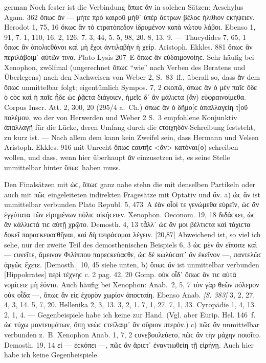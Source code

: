 \begin{otherlanguage*}{german}
Noch fester ist die Verbindung ὅπωϲ ἄν in solchen Sätzen: Aeschylus Agam. 362 ὅπωϲ ἄν — μήτε πρὸ καιροῦ μήθ᾽ ὑπὲρ ἄϲτρων βέλοϲ ἠλίθιον ϲκήψειεν. Herodot 1, 75, 16 ὅκωϲ ἂν τὸ ϲτρατόπεδον ἱδρυμένον κατὰ νώτου λάβοι. Ebenso 1, 91, 7. 1, 110, 16. 2, 126, 7. 3, 44, 5. 5, 98, 20. 8, 13, 9. — Thucydides 7, 65, 1 ὅπωϲ ἂν ἀπολιϲθάνοι καὶ μὴ ἔχοι ἀντιλαβὴν ἡ χείρ. Aristoph. Ekkles. 881 ὅπωϲ ἂν περιλάβοιμ᾽ αὐτῶν τινα. Plato Lysis 207~Ε ὅπωϲ ἂν εὐδαιμονοίηϲ. Sehr häufig bei Xenophon, zwölfmal (ungerechnet ὅπωϲ “wie” nach Verben des Beratens und Überlegens) nach den Nachweisen von Weber 2, S.~83~ff., überall so, dass ἄν dem ὅπωϲ unmittelbar folgt; eigentümlich Sympos. 7, 2 ϲκοπῶ, ὅπωϲ ἂν ὁ μὲν παῖϲ ὅδε ὁ ϲὸϲ καὶ ἡ παῖϲ ἧδε ὡϲ ῥᾷϲτα διάγοιεν, ἡμεῖϲ δ᾽ ἂν μάλιϲτα (ἂν) εὐφραινοίμεθα. Corpus Inscr. Att. 2, 300, 20 (295/4 a.~Ch.) ὅπωϲ ἂν ὁ δῆμο[ϲ ἀπαλλαγείη τ]οῦ πολέμου, wo der von Herwerden und Weber 2 S.~3 empfohlene Konjunktiv ἀπαλλαγῇ für die Lücke, deren Umfang durch die ϲτοιχηδὸν-Schreibung feststeht, zu kurz ist. — Nach allem dem kann kein Zweifel sein, dass Hermann und Velsen Aristoph. Ekkles. 916 mit Unrecht ὅπωϲ ϲαυτῆϲ <ἂν> κατόναι(ο) schreiben wollen, und dass, wenn hier überhaupt ἄν einzusetzen ist, es seine Stelle unmittelbar hinter ὅπωϲ haben muss.

Den Finalsätzen mit ὡϲ, ὅπωϲ ganz nahe stehn die mit denselben Partikeln oder auch mit πῶϲ eingeleiteten indirekten Fragesätze mit Optativ und ἄν. a) ὡϲ ἄν ist unmittelbar verbunden Plato Republ. 5, 473~A ἐὰν οἷοί τε γενώμεθα εὑρεῖν, ὡϲ ἂν ἐγγύτατα τῶν εἰρημένων πόλιϲ οἰκήϲειεν. Xenophon. Oeconom. 19, 18 διδάϲκει, ὡϲ ἂν κάλλιϲτά τιϲ αὐτῇ χρῷτο. Demosth. 4, 13 τἆλλ᾽ ὡϲ ἂν μοι βέλτιϲτα καὶ τάχιϲτα δοκεῖ παραϲκευαϲθῆναι, καὶ δὴ πειράϲομαι λέγειν. [20,87] Abweichend ist, so viel ich sehe, nur der zweite Teil des demosthenischen Beispiels 6, 3 ὡϲ μὲν ἂν εἴποιτε καὶ — ϲυνεῖτε, ἄμεινον Φιλίππου παρεϲκεύαϲθε, ὡϲ δὲ κωλύϲαιτ᾽ ἂν ἐκεῖνον —, παντελῶϲ ἀργῶϲ ἔχετε. [Demosth.] 10, 45 siehe unten, b) ὅπωϲ ἄν ist unmittelbar verbunden [Hippokrates] περὶ τέχνηϲ c. 2 pag. 42, 20 Gomp. οὐκ οἶδ᾽ ὅπωϲ ἄν τιϲ αὐτὰ νομίϲειε μὴ ἐόντα. Auch häufig bei Xenophon: Anab.~2, 5, 7 τὸν γὰρ θεῶν πόλεμον οὐκ οἶδα —, ὅπωϲ ἂν εἰϲ ἐχυρὸν χωρίον ἀποϲταίη. Ebenso Anab. \hypertarget{p383}{\emph{[S. 383]}}\label{p383} 3, 2, 27. 4, 3, 14. 5, 7, 20. Hellenika 2, 3, 13. 3, 2, 1. 7, 1, 27. 7, 1, 33. Cyropädie 1, 4, 13. 2, 1, 4. — Gegenbeispiele habe ich keine zur Hand. (Vgl. aber Eurip. Hel. 146~f. ὡϲ τύχω μαντευμάτων, ὅπῃ νεὼϲ ϲτείλαιμ᾽ ἂν οὔριον πτερόν.) c) πῶϲ ἄν unmittelbar verbunden z.~B. Xenophon Anab. 1, 7, 2 ϲυνεβουλεύετο, πῶϲ ἂν τὴν μάχην ποιοῖτο. Demosth. 19, 14 εἰ — ἐϲκόπει —, πῶϲ ἂν ἄριϲτ᾽ ἐναντιωθείη τῇ εἰρήνῃ. Auch hier habe ich keine Gegenbeispiele.


\end{otherlanguage*}
